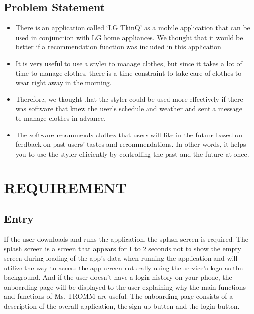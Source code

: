 \documentclass[conference]{IEEEtran}
\begin{document}
\subsection{Problem Statement}\label{SCM}
\begin{itemize}
\item There is an application called ‘LG ThinQ’ as a mobile application that can be used in conjunction with LG home appliances. We thought that it would be better if a recommendation function was included in this application
\item It is very useful to use a styler to manage clothes, but since it takes a lot of time to manage clothes, there is a time constraint to take care of clothes to wear right away in the morning.
\item Therefore, we thought that the styler could be used more effectively if there was software that knew the user’s schedule and weather and sent a message to manage clothes in advance.
\item The software recommends clothes that users will like in the future based on feedback on past users’ tastes and recommendations. In other words, it helps you to use the styler efficiently by controlling the past and the future at once.\\
\end{itemize}

\section{REQUIREMENT}

\subsection{Entry}
If the user downloads and runs the application, the splash screen is required. The splash screen is a screen that appears for 1 to 2 seconds not to show the empty screen during loading of the app's data when running the application and will utilize the way to access the app screen naturally using the service's logo as the background. And if the user doesn’t have a login history on your phone, the onboarding page will be displayed to the user explaining why the main functions and functions of Ms. TROMM are useful. The onboarding page consists of a description of the overall application, the sign-up button and the login button.\\
\end{document}
